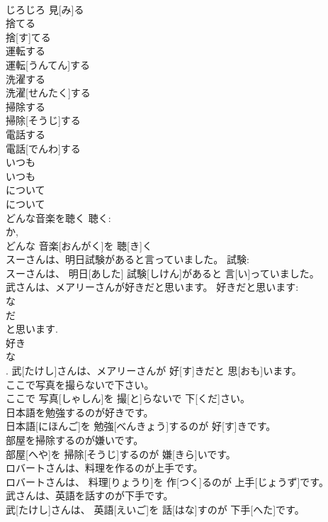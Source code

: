 \documentclass[8pt]{extreport}
\begin{document}
\begin{CJK}{UTF8}{min}
\\	じろじろ 見[み]る		
\\	捨てる	
\\	捨[す]てる		
\\	運転する	
\\	運転[うんてん]する		
\\	洗濯する	
\\	洗濯[せんたく]する		
\\	掃除する	
\\	掃除[そうじ]する		
\\	電話する	
\\	電話[でんわ]する		
\\	いつも	
\\	いつも		
\\	について	
\\	について		
\\	どんな音楽を聴く	聴く: 
\\	か, 
\\	どんな 音楽[おんがく]を 聴[き]く		
\\	スーさんは、明日試験があると言っていました。	試験: 
\\	スーさんは、 明日[あした] 試験[しけん]があると 言[い]っていました。		
\\	武さんは、メアリーさんが好きだと思います。	好きだと思います: 
\\	な 
\\	だ 
\\	と思います. 
\\	好き 
\\	な 
\\	[好きな].	武[たけし]さんは、メアリーさんが 好[す]きだと 思[おも]います。	
\\	ここで写真を撮らないで下さい。	
\\	ここで 写真[しゃしん]を 撮[と]らないで 下[くだ]さい。	
\\	日本語を勉強するのが好きです。	
\\	日本語[にほんご]を 勉強[べんきょう]するのが 好[す]きです。	
\\	部屋を掃除するのが嫌いです。	
\\	部屋[へや]を 掃除[そうじ]するのが 嫌[きら]いです。	
\\	ロバートさんは、料理を作るのが上手です。	
\\	ロバートさんは、 料理[りょうり]を 作[つく]るのが 上手[じょうず]です。	
\\	武さんは、英語を話すのが下手です。	
\\	武[たけし]さんは、 英語[えいご]を 話[はな]すのが 下手[へた]です。	

\end{CJK}
\end{document}
